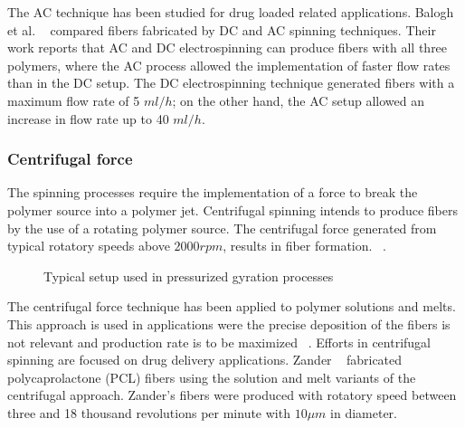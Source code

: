 \documentclass[5p,,preprint,12pt,twocolumn]{elsarticle}
\makeatletter
\def\fixFloatSize#1{}%
\makeatother
\begin{document}
The AC technique has been studied for drug loaded related applications. Balogh et al. \unskip~\cite{527120:13445177} compared fibers fabricated by DC and AC spinning techniques. Their work reports that AC and DC electrospinning can produce fibers with all three polymers, where the AC process allowed the implementation of faster flow rates than in the DC setup. The DC electrospinning technique generated fibers with a maximum flow rate of 5 $ml/h $; on the other hand, the AC setup allowed an increase in flow rate up to 40 $ml/h $.



\subsubsection{Centrifugal force}The spinning processes require the implementation of a force to break the polymer source into a polymer jet. Centrifugal spinning intends to produce fibers by the use of a rotating polymer source. The centrifugal force generated from typical rotatory speeds above $2000 rpm $, results in fiber formation. \unskip~\cite{527120:13535559,527120:13535561}.


\bgroup
\fixFloatSize{images/19c94c11-1ae0-47bd-95ef-4dc5ceedc20d-uimg_gyro_es.png}
\begin{figure}[!htbp]
\centering \makeatletter{}
\makeatother 
\caption{{Typical setup used in pressurized gyration processes}}
\label{f-7cf6ac702e28}
\end{figure}
\egroup
The centrifugal force technique has been applied to polymer solutions and melts. This approach is used in applications were the precise deposition of the fibers is not relevant and production rate is to be maximized \unskip~\cite{527120:13535894}.  Efforts in centrifugal spinning are focused on drug delivery applications. Zander \unskip~\cite{527120:13535977} fabricated polycaprolactone (PCL) fibers using the solution and melt variants of the centrifugal approach. Zander's fibers were produced with rotatory speed between three and 18 thousand revolutions per minute with $10 \mu m $ in diameter. 
\end{document}
